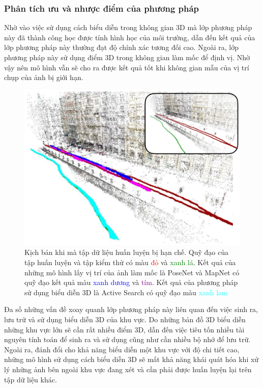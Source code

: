 \subsubsection*{Phân tích ưu và nhược điểm của phương pháp}
Nhờ vào việc sử dụng cách biểu diễn trong không gian 3D mà lớp phương pháp này đã thành công học được tính hình học của môi trường, dẫn đến kết quả của lớp phương pháp này thường đạt độ chính xác tương đối cao. Ngoài ra, lớp phương pháp này sử dụng điểm 3D trong không gian làm mốc để định vị. Nhờ vậy nên mô hình vẫn sẽ cho ra được kết quả tốt khi không gian mẫu của vị trí chụp của ảnh bị giới hạn.

\begin{figure}[H]
    \centering
    \includegraphics[scale=0.7]{pics/Chapter2/lim.png}
    \caption[Kịch bản so sánh phương pháp 3D và phương pháp sử dụng biểu diễn ngầm \cite{sattler2019understanding}]{Kịch bản khi mà tập dữ liệu huấn luyện bị hạn chế. Quỹ đạo của tập huấn luyện và tập kiểm thử có màu \textcolor{red}{đỏ} và \textcolor{green}{xanh lá}. Kết quả của những mô hình lấy vị trí của ảnh làm mốc là PoseNet \cite{kendall2016posenet} và MapNet \cite{brahmbhatt2018geometryaware} có quỹ đạo kết quả màu \textcolor{blue}{xanh dương} và \textcolor{purple}{tím}. Kết quả của phương pháp sử dụng biểu diễn 3D là Active Search \cite{sattler2016efficient} có quỹ đạo màu \textcolor{cyan}{xanh lam}}
\end{figure}

Đa số những vấn đề xoay quanh lớp phương pháp này liên quan đến việc sinh ra, lưu trữ và sử dụng biểu diễn 3D của khu vực. Do những bản đồ 3D biểu diễn những khu vực lớn sẽ cần rất nhiều điểm 3D, dẫn đến việc tiêu tốn nhiều tài nguyên tính toán để sinh ra và sử dụng cũng như cần nhiều bộ nhớ để lưu trữ. Ngoài ra, đánh đổi cho khả năng biểu diễn một khu vực với độ chi tiết cao, những mô hình sử dụng cách biểu diễn 3D sẽ mất khả năng khái quát hóa khi xử lý những ảnh bên ngoài khu vực đang xét và cần phải được huấn luyện lại trên tập dữ liệu khác.

